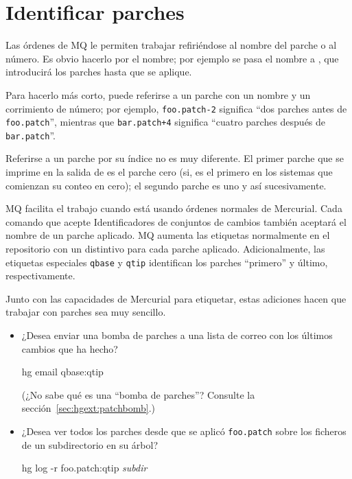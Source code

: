 \section{Identificar parches}

Las órdenes de MQ le permiten trabajar refiriéndose al nombre del
parche o al número.  Es obvio hacerlo por el nombre; por ejemplo se
pasa el nombre  a , que
introducirá los parches hasta que  se aplique.  

Para hacerlo más corto, puede referirse a un parche con un nombre y un
corrimiento de número; por ejemplo,  \texttt{foo.patch-2} significa
``dos parches antes de \texttt{foo.patch}'', mientras que
\texttt{bar.patch+4} significa ``cuatro parches después de \texttt{bar.patch}''.

Referirse a un parche por su índice no es muy diferente.  El primer
parche que se imprime en la salida de  es el
parche cero (si, es el primero en los sistemas que comienzan su conteo
en cero); el segundo parche es uno y así sucesivamente.

MQ facilita el trabajo cuando está usando órdenes normales de
Mercurial.  Cada comando que acepte Identificadores de conjuntos de
cambios también aceptará el nombre de un parche aplicado.  MQ aumenta
las etiquetas normalmente en el repositorio con un distintivo para cada
parche aplicado.  Adicionalmente, las etiquetas especiales \texttt{qbase} y \texttt{qtip} identifican los parches
``primero'' y último, respectivamente.

Junto con las capacidades de Mercurial para etiquetar, estas adiciones
hacen que trabajar con parches sea muy sencillo.
\begin{itemize}
\item ¿Desea enviar una bomba de parches a una lista de correo con los
  últimos cambios que ha hecho?
  \begin{codesample4}
    hg email qbase:qtip
  \end{codesample4}
  (¿No sabe qué es una ``bomba de parches''?  Consulte la
  sección~\ref{sec:hgext:patchbomb}.)
\item ¿Desea ver todos los parches desde que se aplicó
  \texttt{foo.patch} sobre los ficheros de un subdirectorio en su
  árbol?
  \begin{codesample4}
    hg log -r foo.patch:qtip \emph{subdir}
  \end{codesample4}
\end{itemize}

